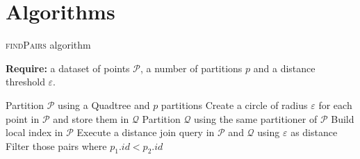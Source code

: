 \documentclass{article}
\begin{document}
    \section*{Algorithms}
    \begin{algorithm} \caption{\textsc{findPairs} algorithm}
        \textbf{Require:} a dataset of points $\mathcal P$, a number of partitions $p$ and a distance threshold $\varepsilon$.
        \begin{algorithmic}[1]
            \State Partition $\mathcal P$ using a Quadtree and $p$ partitions 
            \State Create a circle of radius $\varepsilon$ for each point in $\mathcal P$ and store them in $\mathcal Q$ 
            \State Partition $\mathcal Q$ using the same partitioner of $\mathcal P$
            \State Build local index in $\mathcal P$ 
            \State Execute a distance join query in $\mathcal P$ and $\mathcal Q$ using $\varepsilon$ as distance 
            \State Filter those pairs where $p_1.id < p_2.id$
        \EndFunction
        \end{algorithmic}
    \end{algorithm}
\end{document}
